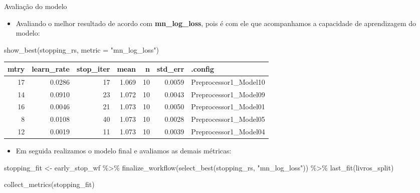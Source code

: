 \documentclass[
  9 pt,
  ignorenonframetext,
]{beamer}
\newenvironment{Shaded}{\begin{snugshade}}{\end{snugshade}}
\newcommand{\AttributeTok}[1]{\textcolor[rgb]{0.77,0.63,0.00}{#1}}
\newcommand{\FunctionTok}[1]{\textcolor[rgb]{0.00,0.00,0.00}{#1}}
\newcommand{\NormalTok}[1]{#1}
\newcommand{\OtherTok}[1]{\textcolor[rgb]{0.56,0.35,0.01}{#1}}
\newcommand{\SpecialCharTok}[1]{\textcolor[rgb]{0.00,0.00,0.00}{#1}}
\newcommand{\StringTok}[1]{\textcolor[rgb]{0.31,0.60,0.02}{#1}}
\providecommand{\tightlist}{%
  \setlength{\itemsep}{0pt}\setlength{\parskip}{0pt}}
\begin{document}
\begin{frame}[fragile]{Avaliação do modelo}
\begin{itemize}
\tightlist
\item
  Avaliando o melhor resultado de acordo com \textbf{mn\_log\_loss},
  pois é com ele que acompanhamos a capacidade de aprendizagem do
  modelo:
\end{itemize}

\begin{Shaded}
\begin{Highlighting}[]
\FunctionTok{show\_best}\NormalTok{(stopping\_rs, }\AttributeTok{metric =} \StringTok{"mn\_log\_loss"}\NormalTok{)}
\end{Highlighting}
\end{Shaded}

\begin{table}[H]
\centering
\begin{tabular}{rrrrrrl}
\toprule
mtry & learn\_rate & stop\_iter & mean & n & std\_err & .config\\
\midrule
17 & 0.0286 & 17 & 1.069 & 10 & 0.0059 & Preprocessor1\_Model10\\
14 & 0.0910 & 23 & 1.072 & 10 & 0.0043 & Preprocessor1\_Model09\\
16 & 0.0046 & 21 & 1.073 & 10 & 0.0050 & Preprocessor1\_Model01\\
8 & 0.0108 & 40 & 1.073 & 10 & 0.0028 & Preprocessor1\_Model05\\
12 & 0.0019 & 11 & 1.073 & 10 & 0.0039 & Preprocessor1\_Model04\\
\bottomrule
\end{tabular}
\end{table}

\begin{itemize}
\tightlist
\item
  Em seguida realizamos o modelo final e avaliamos as demais métricas:
\end{itemize}

\begin{Shaded}
\begin{Highlighting}[]
\NormalTok{stopping\_fit }\OtherTok{\textless{}{-}}\NormalTok{ early\_stop\_wf }\SpecialCharTok{\%\textgreater{}\%}
  \FunctionTok{finalize\_workflow}\NormalTok{(}\FunctionTok{select\_best}\NormalTok{(stopping\_rs, }\StringTok{"mn\_log\_loss"}\NormalTok{)) }\SpecialCharTok{\%\textgreater{}\%}
  \FunctionTok{last\_fit}\NormalTok{(livros\_split)}

\FunctionTok{collect\_metrics}\NormalTok{(stopping\_fit)}
\end{Highlighting}
\end{Shaded}


\end{frame}
\end{document}
